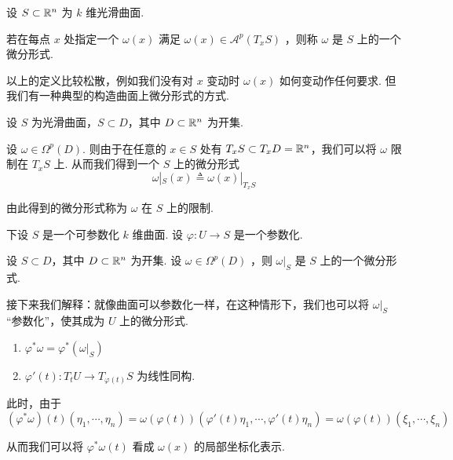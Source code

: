 
\begin{definition}
    设 $S\subset\mathbb{R}^n$ 为 $k$ 维光滑曲面.

    若在每点 $x$ 处指定一个 $\omega(x)$ 满足 $\omega(x)\in\mathscr{A}^p(T_xS)$ ，则称 $\omega$ 是 $S$ 上的一个微分形式.
\end{definition}

\begin{hint}
    以上的定义比较松散，例如我们没有对 $x$ 变动时 $\omega(x)$ 如何变动作任何要求. 但我们有一种典型的构造曲面上微分形式的方式.
\end{hint}

\begin{example}
    设 $S$ 为光滑曲面，$S\subset D$，其中 $D\subset\mathbb{R}^n$ 为开集.

    设 $\omega\in\Omega^p(D)$. 则由于在任意的 $x\in S$ 处有 $T_xS\subset T_xD=\mathbb{R}^n$，我们可以将 $\omega$ 限制在 $T_xS$ 上. 从而我们得到一个 $S$ 上的微分形式
$$
\omega|_S(x)\triangleq\omega(x)|_{T_xS}
$$

    由此得到的微分形式称为 $\omega$ 在 $S$ 上的限制.
\end{example}

下设 $S$ 是一个可参数化 $k$ 维曲面. 设 $\varphi:U\to S$ 是一个参数化.

设 $S\subset D$，其中 $D\subset\mathbb{R}^n$ 为开集. 设 $\omega\in\Omega^p(D)$ ，则 $\omega|_S$ 是 $S$ 上的一个微分形式.

接下来我们解释：就像曲面可以参数化一样，在这种情形下，我们也可以将 $\omega|_S$ “参数化”，使其成为 $U$ 上的微分形式.

\begin{property}
    \begin{enumerate}
        \item $\varphi^*\omega=\varphi^*(\omega|_S)$
        
        \item $\varphi'(t):T_tU\to T_{\varphi(t)}S$ 为线性同构.
    \end{enumerate}
\end{property}

此时，由于
$$
(\varphi^*\omega)(t)(\eta_1,\cdots,\eta_n)=\omega(\varphi(t))(\varphi'(t)\eta_1,\cdots,\varphi'(t)\eta_n)=\omega(\varphi(t))(\xi_1,\cdots,\xi_n)
$$

从而我们可以将 $\varphi^*\omega(t)$ 看成 $\omega(x)$ 的局部坐标化表示.

